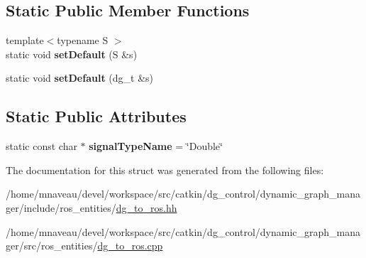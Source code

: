 \subsection*{Static Public Member Functions}
\begin{DoxyCompactItemize}
\item 
{\footnotesize template$<$typename S $>$ }\\static void {\bfseries set\+Default} (S \&s)\hypertarget{structdynamic__graph_1_1DgToRos_3_01double_01_4_ab21237e1e16bdb81d3c31f3be382b8ad}{}\label{structdynamic__graph_1_1DgToRos_3_01double_01_4_ab21237e1e16bdb81d3c31f3be382b8ad}

\item 
static void {\bfseries set\+Default} (dg\+\_\+t \&s)\hypertarget{structdynamic__graph_1_1DgToRos_3_01double_01_4_ad6ad3bc75e6e7d80d44fa9d4c9eee4ea}{}\label{structdynamic__graph_1_1DgToRos_3_01double_01_4_ad6ad3bc75e6e7d80d44fa9d4c9eee4ea}

\end{DoxyCompactItemize}
\subsection*{Static Public Attributes}
\begin{DoxyCompactItemize}
\item 
static const char $\ast$ {\bfseries signal\+Type\+Name} = \char`\"{}Double\char`\"{}\hypertarget{structdynamic__graph_1_1DgToRos_3_01double_01_4_a686b38d74e19c6de7308e8d1ae86cf8c}{}\label{structdynamic__graph_1_1DgToRos_3_01double_01_4_a686b38d74e19c6de7308e8d1ae86cf8c}

\end{DoxyCompactItemize}


The documentation for this struct was generated from the following files\+:\begin{DoxyCompactItemize}
\item 
/home/mnaveau/devel/workspace/src/catkin/dg\+\_\+control/dynamic\+\_\+graph\+\_\+manager/include/ros\+\_\+entities/\hyperlink{dg__to__ros_8hh}{dg\+\_\+to\+\_\+ros.\+hh}\item 
/home/mnaveau/devel/workspace/src/catkin/dg\+\_\+control/dynamic\+\_\+graph\+\_\+manager/src/ros\+\_\+entities/\hyperlink{dg__to__ros_8cpp}{dg\+\_\+to\+\_\+ros.\+cpp}\end{DoxyCompactItemize}
